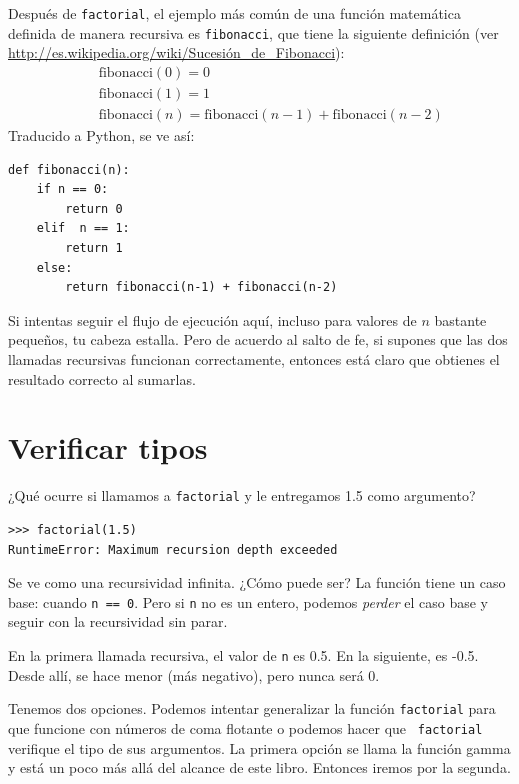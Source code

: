 \documentclass[10pt]{book}
\begin{document}
Después de {\tt factorial}, el ejemplo más común de una función
matemática definida de manera recursiva es {\tt fibonacci}, que tiene la
siguiente definición (ver
  \url{http://es.wikipedia.org/wiki/Sucesión_de_Fibonacci}):
%
\begin{eqnarray*}
&& \mathrm{fibonacci}(0) = 0 \\
&& \mathrm{fibonacci}(1) = 1 \\
&& \mathrm{fibonacci}(n) = \mathrm{fibonacci}(n-1) + \mathrm{fibonacci}(n-2)
\end{eqnarray*}
%
Traducido a Python, se ve así:

\begin{verbatim}
def fibonacci(n):
    if n == 0:
        return 0
    elif  n == 1:
        return 1
    else:
        return fibonacci(n-1) + fibonacci(n-2)
\end{verbatim}
%
Si intentas seguir el flujo de ejecución aquí, incluso para valores
de $n$ bastante pequeños, tu cabeza estalla.  Pero de acuerdo al
salto de fe, si supones que las dos llamadas recursivas
funcionan correctamente, entonces está claro que obtienes
el resultado correcto al sumarlas.


\section{Verificar tipos}
\label{guardian}

¿Qué ocurre si llamamos a {\tt factorial} y le entregamos 1.5 como argumento?

\begin{verbatim}
>>> factorial(1.5)
RuntimeError: Maximum recursion depth exceeded
\end{verbatim}
%
Se ve como una recursividad infinita.  ¿Cómo puede ser?  La función
tiene un caso base: cuando {\tt n == 0}.  Pero si {\tt n} no es un entero,
podemos {\em perder} el caso base y seguir con la recursividad sin parar.

En la primera llamada recursiva, el valor de {\tt n} es 0.5.
En la siguiente, es -0.5.  Desde allí, se hace menor
(más negativo), pero nunca será 0.

Tenemos dos opciones.  Podemos intentar generalizar la función {\tt factorial}
para que funcione con números de coma flotante o podemos hacer que {\tt
  factorial} verifique el tipo de sus argumentos.  La primera opción se
llama la función gamma y está
un poco más allá del alcance de este libro.  Entonces iremos por la segunda.
\end{document}
